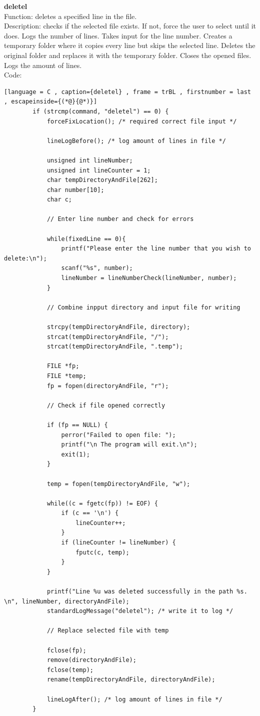 \documentclass[a4paper]{article}
\theoremstyle{plain}
\theoremstyle{definition}
\theoremstyle{remark}
\begin{document}
\textbf{deletel} \\
Function: deletes a specified line in the file. \\
Description: checks if the selected file exists. If not, force the user to select until it does. Logs the number of lines. Takes input for the line number. Creates a temporary folder where it copies every line but skips the selected line. Deletes the original folder and replaces it with the temporary folder. Closes the opened files. Logs the amount of lines. \\
Code: 
\begin{lstlisting}[language = C , caption={deletel} , frame = trBL , firstnumber = last , escapeinside={(*@}{@*)}]
		if (strcmp(command, "deletel") == 0) {
			forceFixLocation(); /* required correct file input */

			lineLogBefore(); /* log amount of lines in file */

			unsigned int lineNumber;
			unsigned int lineCounter = 1;
			char tempDirectoryAndFile[262];
			char number[10];
			char c;

			// Enter line number and check for errors

			while(fixedLine == 0){
				printf("Please enter the line number that you wish to delete:\n");
				scanf("%s", number);
				lineNumber = lineNumberCheck(lineNumber, number);
			}

			// Combine inpput directory and input file for writing

			strcpy(tempDirectoryAndFile, directory);
			strcat(tempDirectoryAndFile, "/");
			strcat(tempDirectoryAndFile, ".temp");

			FILE *fp;
			FILE *temp;
			fp = fopen(directoryAndFile, "r");

			// Check if file opened correctly

			if (fp == NULL) {
    			perror("Failed to open file: ");
    			printf("\n The program will exit.\n");
    			exit(1);
			}
			
			temp = fopen(tempDirectoryAndFile, "w");

			while((c = fgetc(fp)) != EOF) {
				if (c == '\n') {
					lineCounter++;
				}
				if (lineCounter != lineNumber) {
					fputc(c, temp);
				}
			}

			printf("Line %u was deleted successfully in the path %s. \n", lineNumber, directoryAndFile);
			standardLogMessage("deletel"); /* write it to log */

			// Replace selected file with temp

			fclose(fp);
			remove(directoryAndFile);
			fclose(temp);
			rename(tempDirectoryAndFile, directoryAndFile);

			lineLogAfter(); /* log amount of lines in file */
		}
\end{lstlisting}
\end{document}

